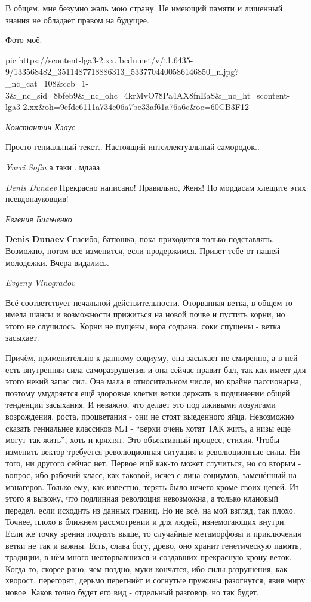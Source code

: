 В общем, мне безумно жаль мою страну. Не имеющий памяти и лишенный знания не обладает правом на будущее.

Фото моё.

\ifcmt
  pic https://scontent-lga3-2.xx.fbcdn.net/v/t1.6435-9/133568482_3511487718886313_5337704400586146850_n.jpg?_nc_cat=108&ccb=1-3&_nc_sid=8bfeb9&_nc_ohc=4krMvO78Pa4AX8fnEaS&_nc_ht=scontent-lga3-2.xx&oh=9efde6111a734e06a7be33af61a76a6c&oe=60CB3F12
\fi

\emph{Константин Клаус}

Просто гениальный текст.. Настоящий интеллектуальный самородок..

\emph{Yurri Sofin}
а таки ..мдааа.

\emph{Denis Dunaev}
Прекрасно написано! Правильно, Женя! По мордасам хлещите этих псевдонауковцив!

\emph{Евгения Бильченко}

\textbf{Denis Dunaev} Спасибо, батюшка, пока приходится только подставлять.
Возможно, потом все изменится, если продержимся. Привет тебе от нашей
молодежки. Вчера видались.

\emph{Evgeny Vinogradov}

Всё соответствует печальной действительности. Оторванная ветка, в общем-то
имела шансы и возможности прижиться на новой почве и пустить корни, но этого не
случилось. Корни не пущены, кора содрана, соки спущены - ветка засыхает.

Причём, применительно к данному социуму, она засыхает не смиренно, а в ней есть
внутренняя сила саморазрушения и она сейчас правит бал, так как имеет для этого
некий запас сил. Она мала в относительном числе, но крайне пассионарна, поэтому
умудряется ещё здоровые клетки ветки держать в подчинении общей тенденции
засыхания. И неважно, что делает это под лживыми лозунгами возрождения, роста,
процветания - они не стоят выеденного яйца. Невозможно сказать гениальнее
классиков МЛ - \enquote{верхи очень хотят ТАК жить, а низы ещё могут так жить}, хоть и
кряхтят. Это объективный процесс, стихия. Чтобы изменить вектор требуется
революционная ситуация и революционные силы. Ни того, ни другого сейчас нет.
Первое ещё как-то может случиться, но со вторым - вопрос, ибо рабочий класс,
как таковой, исчез с лица социумов, заменённый на мэнагеров. Только ему, как
известно, терять было нечего кроме своих цепей. Из этого я вывожу, что
подлинная революция невозможна, а только клановый передел, если исходить из
данных границ. Но не всё, на мой взгляд, так плохо. Точнее, плохо в ближнем
рассмотрении и для людей, изнемогающих внутри. Если же точку зрения поднять
выше, то случайные метаморфозы и приключения ветки не так и важны. Есть, слава
богу, древо, оно хранит генетическую память, традиции, в нём много
неоторвавшихся и создавших прекрасную крону веток. Когда-то, скорее рано, чем
поздно, муки кончатся, ибо силы разрушения, как хворост, перегорят, дерьмо
перегниёт и согнутые пружины разогнутся, явив миру новое. Каков точно будет его
вид - отдельный разговор, но так будет.


